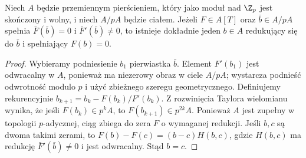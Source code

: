 \begin{lemat}
Niech $A$ będzie przemiennym pierścieniem, który jako moduł nad $\Z_p$ jest skończony i wolny, i niech $A/pA$ będzie ciałem. Jeżeli $F\in A[T]$ oraz $\bar b\in A/pA$ spełnia $\bar F(\bar b)=0$ i $\bar F'(\bar b)\ne0$, to istnieje dokładnie jeden $b\in A$ redukujący się do $\bar b$ i spełniający $F(b)=0$.
\end{lemat}
\begin{proof}
Wybieramy podniesienie $b_1$ pierwiastka $\bar b$. Element $F'(b_1)$ jest odwracalny w $A$, ponieważ ma niezerowy obraz w ciele $A/pA$; wystarcza podnieść odwrotność modulo $p$ i użyć zbieżnego szeregu geometrycznego. Definiujemy rekurencyjnie $b_{k+1}=b_k-F(b_k)/F'(b_k)$. Z rozwinięcia Taylora wielomianu wynika, że jeśli $F(b_k)\in p^k A$, to $F(b_{k+1})\in p^{2k}A$. Ponieważ $A$ jest zupełny w topologii $p$-adycznej, ciąg zbiega do zera $F$ o wymaganej redukcji. Jeśli $b,c$ są dwoma takimi zerami, to $F(b)-F(c)=(b-c)H(b,c)$, gdzie $H(b,c)$ ma redukcję $\bar F'(\bar b)\ne0$ i jest odwracalny. Stąd $b=c$.
\end{proof}

